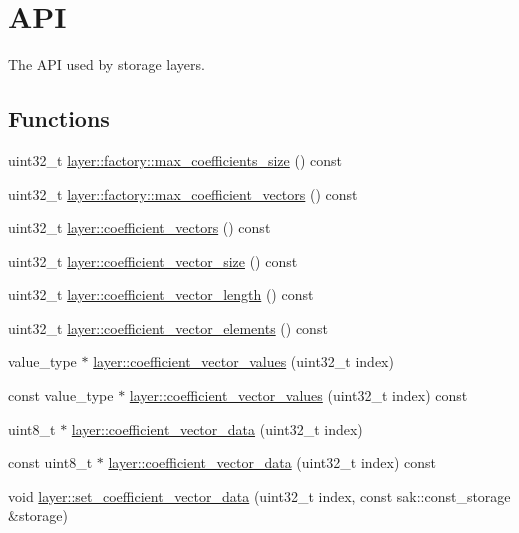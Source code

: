 \hypertarget{group__coefficient__storage__api}{\section{A\-P\-I}
\label{group__coefficient__storage__api}
}


The A\-P\-I used by storage layers.  


\subsection*{Functions}
\begin{DoxyCompactItemize}
\item 
uint32\-\_\-t \hyperlink{group__coefficient__storage__api_ga4bf955840bac622c19cf19c0f8425cca}{layer\-::factory\-::max\-\_\-coefficients\-\_\-size} () const 
\item 
uint32\-\_\-t \hyperlink{group__coefficient__storage__api_ga82899f2e9bb1ac587ce04d480d9e3af8}{layer\-::factory\-::max\-\_\-coefficient\-\_\-vectors} () const 
\item 
uint32\-\_\-t \hyperlink{group__coefficient__storage__api_gad1eec7417e960f93e39d6b12cfab1d53}{layer\-::coefficient\-\_\-vectors} () const 
\item 
uint32\-\_\-t \hyperlink{group__coefficient__storage__api_gad6edd703054ca227046d4d7f827fb1f6}{layer\-::coefficient\-\_\-vector\-\_\-size} () const 
\item 
uint32\-\_\-t \hyperlink{group__coefficient__storage__api_gaca30da6cd0d33efc5ac528eadd43147c}{layer\-::coefficient\-\_\-vector\-\_\-length} () const 
\item 
uint32\-\_\-t \hyperlink{group__coefficient__storage__api_gab1e8bf505965d65dd3044f8d7067e82e}{layer\-::coefficient\-\_\-vector\-\_\-elements} () const 
\item 
value\-\_\-type $\ast$ \hyperlink{group__coefficient__storage__api_ga11529097f8883e4fd619ac1b85e496f6}{layer\-::coefficient\-\_\-vector\-\_\-values} (uint32\-\_\-t index)
\item 
const value\-\_\-type $\ast$ \hyperlink{group__coefficient__storage__api_gabbd848b3d62611d1b13da07755fb050a}{layer\-::coefficient\-\_\-vector\-\_\-values} (uint32\-\_\-t index) const 
\item 
uint8\-\_\-t $\ast$ \hyperlink{group__coefficient__storage__api_gad15e1a9c3d9b24ffdf5e9d2915c03f44}{layer\-::coefficient\-\_\-vector\-\_\-data} (uint32\-\_\-t index)
\item 
const uint8\-\_\-t $\ast$ \hyperlink{group__coefficient__storage__api_gae86412692c0a2384e3702a6504c3b911}{layer\-::coefficient\-\_\-vector\-\_\-data} (uint32\-\_\-t index) const 
\item 
void \hyperlink{group__coefficient__storage__api_ga1cfc9696c66b278ce1e137f48a261601}{layer\-::set\-\_\-coefficient\-\_\-vector\-\_\-data} (uint32\-\_\-t index, const sak\-::const\-\_\-storage \&storage)
\end{DoxyCompactItemize}


